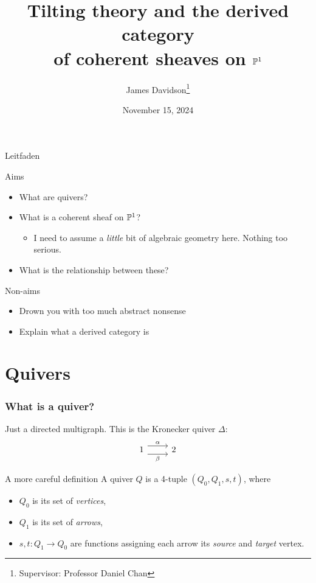 \documentclass[
  xcolor=dvipsnames,
  aspectratio=169,
  compress
]{beamer}
\title{
  Tilting theory and the derived category \\ of coherent sheaves on $\mathbb{P}^{{1}}$
}
\author{James Davidson\footnote{Supervisor: Professor Daniel Chan}}
\institute{
  School of Mathematics and Statistics \\
  UNSW Sydney
}
\date{November 15, 2024}
\begin{document}
\maketitle

\begin{frame}{Leitfaden}
  \begin{exampleblock}{Aims}
    \begin{itemize}
      \item
        What are quivers?

      \item
        What is a coherent sheaf on $\mathbb{P}^{{1}}$?
        \begin{itemize}
          \item I need to assume a \emph{little} bit of algebraic geometry here. Nothing too serious.
        \end{itemize}

      \item
        What is the relationship between these?
    \end{itemize}
  \end{exampleblock}

  \pause

  \begin{alertblock}{Non-aims}
    \begin{itemize}
      \item
        Drown you with too much \alert{abstract nonsense}

      \item
        Explain what a derived category is
    \end{itemize}
  \end{alertblock}
\end{frame}

\section{Quivers}

\begin{frame}[fragile]
  \frametitle{What is a quiver?}
  Just a directed multigraph.
  This is the \alert{Kronecker quiver} $\Delta$:
  \[
    \begin{tikzcd}
      1 & 2
      \arrow["\alpha", shift left=2, from=1-1, to=1-2]
      \arrow["\beta"', shift right=2, from=1-1, to=1-2]
    \end{tikzcd}
  \]

  \pause

  \begin{block}{A more careful definition}
    A \alert{quiver} $Q$ is a 4-tuple $(Q_0, Q_1, s, t)$, where
    \begin{itemize}
      \item $Q_0$ is its set of \emph{vertices},
      \item $Q_1$ is its set of \emph{arrows},
      \item $s, t: Q_1 \to Q_0$ are functions assigning each arrow its \emph{source} and \emph{target} vertex.
    \end{itemize}
  \end{block}
\end{frame}
\end{document}
